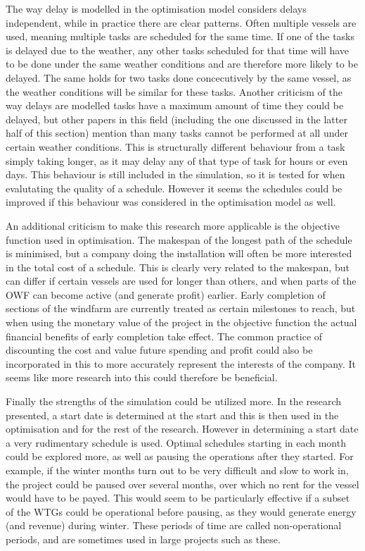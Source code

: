 \documentclass[a4paper,12pt]{article}
\begin{document}
The way delay is modelled in the optimisation model considers delays independent, while in practice there are clear patterns. Often multiple vessels are used, meaning multiple tasks are scheduled for the same time. If one of the tasks is delayed due to the weather, any other tasks scheduled for that time will have to be done under the same weather conditions and are therefore more likely to be delayed. The same holds for two tasks done concecutively by the same vessel, as the weather conditions will be similar for these tasks. 
Another criticism of the way delays are modelled tasks have a maximum amount of time they could be delayed, but other papers in this field (including the one discussed in the latter half of this section) mention than many tasks cannot be performed at all under certain weather conditions. This is structurally different behaviour from a task simply taking longer, as it may delay any of that type of task for hours or even days. This behaviour is still included in the simulation, so it is tested for when evalutating the quality of a schedule. However it seems the schedules could be improved if this behaviour was considered in the optimisation model as well. 

An additional criticism to make this research more applicable is the objective function used in optimisation. The makespan of the longest path of the schedule is minimised, but a company doing the installation will often be more interested in the total cost of a schedule. This is clearly very related to the makespan, but can differ if certain vessels are used for longer than others, and when parts of the OWF can become active (and generate profit) earlier. Early completion of sections of the windfarm are currently treated as certain milestones to reach, but when using the monetary value of the project in the objective function the actual financial benefits of early completion take effect. The common practice of discounting the cost and value future spending and profit could also be incorporated in this to more accurately represent the interests of the company. It seems like more research into this could therefore be beneficial. 

Finally the strengths of the simulation could be utilized more. In the research presented, a start date is determined at the start and this is then used in the optimisation and for the rest of the research. However in determining a start date a very rudimentary schedule is used. Optimal schedules starting in each month could be explored more, as well as pausing the operations after they started. For example, if the winter months turn out to be very difficult and slow to work in, the project could be paused over several months, over which no rent for the vessel would have to be payed. This would seem to be particularly effective if a subset of the WTGs could be operational before pausing, as they would generate energy (and revenue) during winter. These periods of time are called non-operational periods, and are sometimes used in large projects such as these.  
\end{document}
